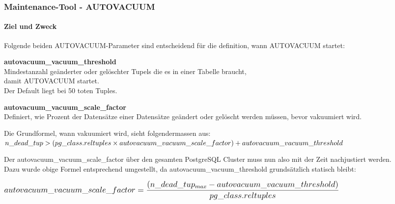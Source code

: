 
\begin{flushleft}
    \subsubsection{Maintenance-Tool - AUTOVACUUM}
    \paragraph{Ziel und Zweck}
    Folgende beiden \Gls{AUTOVACUUM}-Parameter sind entscheidend für die definition, wann \Gls{AUTOVACUUM} startet:
    \begin{description}
        \item \textbf{autovacuum\_vacuum\_threshold}\hfill \\Mindestanzahl geänderter oder gelöschter Tupels die es in einer Tabelle braucht,\\damit \Gls{AUTOVACUUM} startet.\\Der Default liegt bei 50 toten Tuples.
        \item \textbf{autovacuum\_vacuum\_scale\_factor}\hfill \\Definiert, wie Prozent der Datensätze einer Datensätze geändert oder gelöscht werden müssen, bevor vakuumiert wird.
    \end{description}

    Die Grundformel, wann vakuumiert wird, sieht folgendermassen aus:\\
    \(\mathlarger{n\_dead\_tup > (pg\_class.reltuples \times autovacuum\_vacuum\_scale\_factor) + autovacuum\_vacuum\_threshold}\)
\end{flushleft}
\begin{flushleft}
    Der autovacuum\_vacuum\_scale\_factor über den gesamten \Gls{PostgreSQL Cluster} muss nun also mit der Zeit nachjustiert werden.\\
    Dazu wurde obige Formel entsprechend umgestellt, da autovacuum\_vacuum\_threshold grundsätzlich statisch bleibt:
\end{flushleft}
\begin{flushleft}
    \(\mathlarger{\mathlarger{autovacuum\_vacuum\_scale\_factor = \dfrac{(n\_dead\_tup_{max} - autovacuum\_vacuum\_threshold)}{pg\_class.reltuples}}}\)
\end{flushleft}
